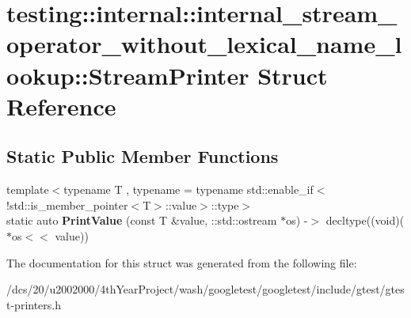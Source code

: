 \hypertarget{structtesting_1_1internal_1_1internal__stream__operator__without__lexical__name__lookup_1_1StreamPrinter}{}\section{testing\+:\+:internal\+:\+:internal\+\_\+stream\+\_\+operator\+\_\+without\+\_\+lexical\+\_\+name\+\_\+lookup\+:\+:Stream\+Printer Struct Reference}
\label{structtesting_1_1internal_1_1internal__stream__operator__without__lexical__name__lookup_1_1StreamPrinter}
\subsection*{Static Public Member Functions}
\begin{DoxyCompactItemize}
\item 
\mbox{\label{structtesting_1_1internal_1_1internal__stream__operator__without__lexical__name__lookup_1_1StreamPrinter_aabcad0130a6252aeec1192f274c798f0}} 
{\footnotesize template$<$typename T , typename  = typename std\+::enable\+\_\+if$<$                !std\+::is\+\_\+member\+\_\+pointer$<$\+T$>$\+::value$>$\+::type$>$ }\\static auto {\bfseries Print\+Value} (const T \&value, \+::std\+::ostream $\ast$os) -\/$>$ decltype((void)($\ast$os$<$$<$ value))
\end{DoxyCompactItemize}


The documentation for this struct was generated from the following file\+:\begin{DoxyCompactItemize}
\item 
/dcs/20/u2002000/4th\+Year\+Project/wash/googletest/googletest/include/gtest/gtest-\/printers.\+h\end{DoxyCompactItemize}
